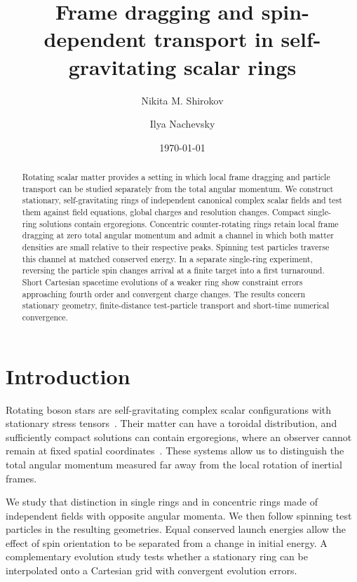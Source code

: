 \documentclass[10pt,twocolumn,floatfix,aps,prd,superscriptaddress,nofootinbib]{revtex4-2}
\begin{document}
\raggedbottom
\title{Frame dragging and spin-dependent transport in self-gravitating scalar rings}
\author{Nikita M. Shirokov}
\author{Ilya Nachevsky}
\date{\today}

\begin{abstract}
Rotating scalar matter provides a setting in which local frame dragging and
particle transport can be studied separately from the total angular momentum.
We construct stationary, self-gravitating rings of independent canonical
complex scalar fields and test them against field equations, global charges
and resolution changes. Compact single-ring solutions contain ergoregions.
Concentric counter-rotating rings retain local frame dragging at zero total
angular momentum and admit a channel in which both matter densities are small
relative to their respective peaks. Spinning test particles traverse this
channel at matched conserved energy. In a separate single-ring experiment,
reversing the particle spin changes arrival at a finite target into a first
turnaround. Short Cartesian spacetime evolutions of a weaker ring show
constraint errors approaching fourth order and convergent charge changes.
The results concern stationary geometry, finite-distance test-particle
transport and short-time numerical convergence.
\end{abstract}
\maketitle

\section{Introduction}
\label{sec:intro}

Rotating boson stars are self-gravitating complex scalar configurations with
stationary stress tensors~\cite{kleihaus2005}. Their matter can have a toroidal
distribution, and sufficiently compact solutions can contain ergoregions,
where an observer cannot remain at fixed spatial coordinates~\cite{kleihaus2008}.
These systems allow us to distinguish the total angular momentum measured
far away from the local rotation of inertial frames.

We study that distinction in single rings and in concentric rings made of
independent fields with opposite angular momenta. We then follow spinning
test particles in the resulting geometries. Equal conserved launch energies
allow the effect of spin orientation to be separated from a change in initial
energy. A complementary evolution study tests whether a stationary ring can
be interpolated onto a Cartesian grid with convergent evolution errors.
\end{document}

